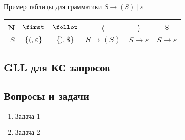 Пример таблицы для грамматики $S \to ( S ) \mid \varepsilon$

\begin{center}
\begin{tabular}{ r || c | c || c | c | c }
N & $\first$ & $\follow$ & ( & ) & $\$ $ \\ \hline  
$S$ & $\{ (, \varepsilon \}$ & $\{ ), \$ \}$ & $S \rightarrow (S)$ & $S \rightarrow \varepsilon$ & $S \rightarrow \varepsilon$ 
\end{tabular}  
\end{center}

\subsection{GLL для КС запросов}

\subsection{Вопросы и задачи}
\begin{enumerate}
  \item Задача 1
  \item Задача 2
\end{enumerate}
